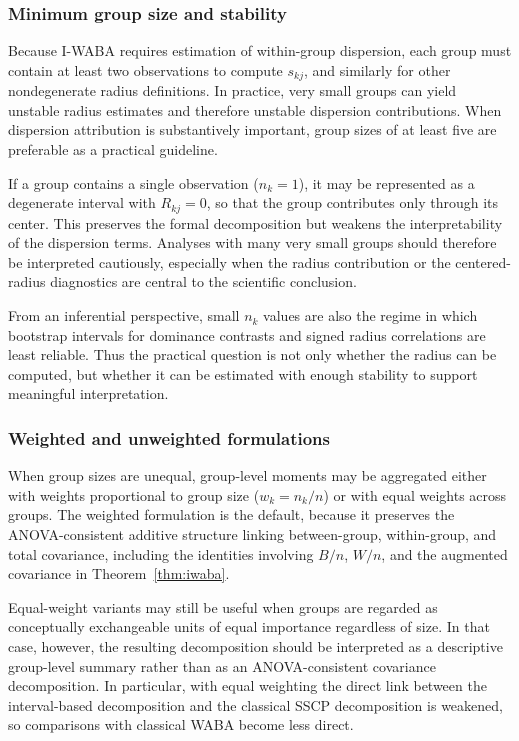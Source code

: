 \documentclass[preprint, times, 12pt, authoryear]{elsarticle}
\begin{document}
\subsubsection{Minimum group size and stability}

Because I-WABA requires estimation of within-group dispersion, each group must contain at least two observations to compute $s_{kj}$, and similarly for other nondegenerate radius definitions. In practice, very small groups can yield unstable radius estimates and therefore unstable dispersion contributions. When dispersion attribution is substantively important, group sizes of at least five are preferable as a practical guideline.

If a group contains a single observation ($n_k=1$), it may be represented as a degenerate interval with $R_{kj}=0$, so that the group contributes only through its center. This preserves the formal decomposition but weakens the interpretability of the dispersion terms. Analyses with many very small groups should therefore be interpreted cautiously, especially when the radius contribution or the centered-radius diagnostics are central to the scientific conclusion.

From an inferential perspective, small $n_k$ values are also the regime in which bootstrap intervals for dominance contrasts and signed radius correlations are least reliable. Thus the practical question is not only whether the radius can be computed, but whether it can be estimated with enough stability to support meaningful interpretation.

\subsubsection{Weighted and unweighted formulations}

When group sizes are unequal, group-level moments may be aggregated either with weights proportional to group size ($w_k=n_k/n$) or with equal weights across groups. The weighted formulation is the default, because it preserves the ANOVA-consistent additive structure linking between-group, within-group, and total covariance, including the identities involving $B/n$, $W/n$, and the augmented covariance in Theorem~\ref{thm:iwaba}.

Equal-weight variants may still be useful when groups are regarded as conceptually exchangeable units of equal importance regardless of size. In that case, however, the resulting decomposition should be interpreted as a descriptive group-level summary rather than as an ANOVA-consistent covariance decomposition. In particular, with equal weighting the direct link between the interval-based decomposition and the classical SSCP decomposition is weakened, so comparisons with classical WABA become less direct.
\end{document}
